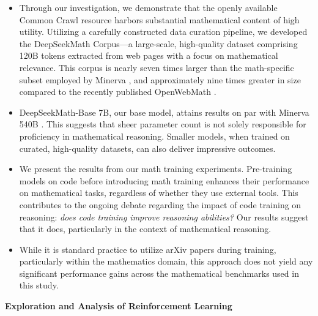 \begin{itemize}[topsep=0pt]
    \item Through our investigation, we demonstrate that the openly available Common Crawl resource harbors substantial mathematical content of high utility. Utilizing a carefully constructed data curation pipeline, we developed the DeepSeekMath Corpus—a large-scale, high-quality dataset comprising 120B tokens extracted from web pages with a focus on mathematical relevance. This corpus is nearly seven times larger than the math-specific subset employed by Minerva \citep{minerva}, and approximately nine times greater in size compared to the recently published OpenWebMath \citep{openwebmath}.

\item DeepSeekMath-Base 7B, our base model, attains results on par with Minerva 540B \citep{minerva}. This suggests that sheer parameter count is not solely responsible for proficiency in mathematical reasoning. Smaller models, when trained on curated, high-quality datasets, can also deliver impressive outcomes.

\item We present the results from our math training experiments. Pre-training models on code before introducing math training enhances their performance on mathematical tasks, regardless of whether they use external tools. This contributes to the ongoing debate regarding the impact of code training on reasoning: \textit{does code training improve reasoning abilities?} Our results suggest that it does, particularly in the context of mathematical reasoning.

\item While it is standard practice to utilize arXiv papers during training, particularly within the mathematics domain, this approach does not yield any significant performance gains across the mathematical benchmarks used in this study.
\end{itemize}

\textbf{Exploration and Analysis of Reinforcement Learning}


